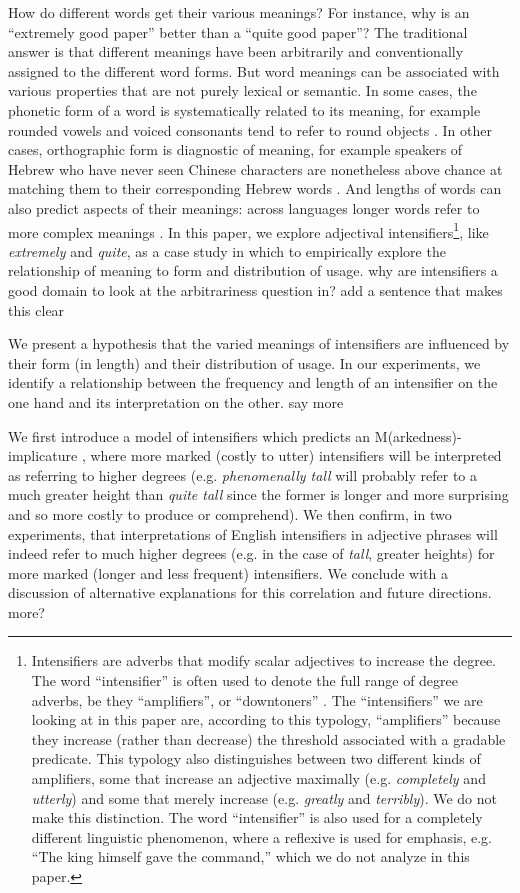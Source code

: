 \documentclass[10pt,letterpaper]{article}
\newcommand{\w}[1]{\emph{#1}}
\newcommand{\todo}[1]{{\color{red}#1}}
\begin{document}
How do different words get their various meanings? For instance, why is an ``extremely good paper'' better than a ``quite good paper''? The traditional answer \cite{saussure} is that different meanings have been arbitrarily and conventionally assigned to the different word forms.
But word meanings can be associated with various properties that are not purely lexical or semantic. In some cases, the phonetic form of a word is systematically related to its meaning, for example rounded vowels and voiced consonants tend to refer to round objects \cite{maluma-takete, bouba-kiki, bouba-kiki2, takete-uloomo}. In other cases, orthographic form is diagnostic of meaning, for example speakers of Hebrew who have never seen Chinese characters are nonetheless above chance at matching them to their corresponding Hebrew words \cite{koriat}. And lengths of words can also predict aspects of their meanings: across languages longer words refer to more complex meanings \cite{lewis}.
In this paper,
we explore adjectival intensifiers\footnote{Intensifiers are adverbs that modify scalar adjectives to increase the degree. The word ``intensifier'' is often used to denote the full range of degree adverbs, be they ``amplifiers'', or ``downtoners'' \cite{quirk}. The ``intensifiers'' we are looking at in this paper are, according to this typology, ``amplifiers'' because they increase (rather than decrease) the threshold associated with a gradable predicate. This typology also distinguishes between two different kinds of amplifiers, some that increase an adjective maximally (e.g. \w{completely} and \w{utterly}) and some that merely increase (e.g. \w{greatly} and \w{terribly}). We do not make this distinction. The word ``intensifier'' is also used for a completely different linguistic phenomenon, where a reflexive is used for emphasis, e.g. ``The king himself gave the command,'' which we do not analyze in this paper.}, like \w{extremely} and \w{quite},
as a case study in which to empirically explore the relationship of meaning to form and distribution of usage.
\todo{why are intensifiers a good domain to look at the arbitrariness question in? add a sentence that makes this clear}

We present a hypothesis that the varied meanings of intensifiers are influenced by their form (in length) and their distribution of usage.
In our experiments, we identify a relationship between the frequency and length of an intensifier on the one hand and its interpretation on the other.
\todo{say more}

We first introduce a model of intensifiers which predicts an M(arkedness)-implicature \cite{levinson}, where more marked (costly to utter) intensifiers will be interpreted as referring to higher degrees (e.g. \w{phenomenally tall} will probably refer to a much greater height than \w{quite tall} since the former is longer and more surprising and so more costly to produce or comprehend).
We then confirm, in two experiments, that interpretations of English intensifiers in adjective phrases will indeed refer to much higher degrees (e.g. in the case of \w{tall}, greater heights) for more marked (longer and less frequent) intensifiers. We conclude with a discussion of alternative explanations for this correlation and future directions.
\todo{more?}
\end{document}

